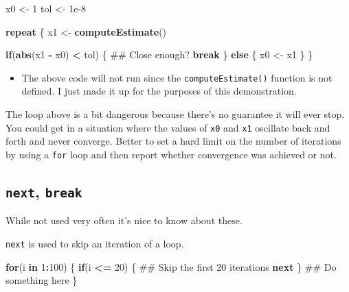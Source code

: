 \documentclass[]{book}
\newenvironment{Shaded}{\begin{snugshade}}{\end{snugshade}}
\newcommand{\ControlFlowTok}[1]{\textcolor[rgb]{0.13,0.29,0.53}{\textbf{#1}}}
\newcommand{\DecValTok}[1]{\textcolor[rgb]{0.00,0.00,0.81}{#1}}
\newcommand{\FloatTok}[1]{\textcolor[rgb]{0.00,0.00,0.81}{#1}}
\newcommand{\KeywordTok}[1]{\textcolor[rgb]{0.13,0.29,0.53}{\textbf{#1}}}
\newcommand{\NormalTok}[1]{#1}
\newcommand{\OperatorTok}[1]{\textcolor[rgb]{0.81,0.36,0.00}{\textbf{#1}}}
\newcommand{\StringTok}[1]{\textcolor[rgb]{0.31,0.60,0.02}{#1}}
\newenvironment{rmdblock}[1]
  {\begin{shaded*}
  \begin{itemize}
  \renewcommand{\labelitemi}{
    \raisebox{-.7\height}[0pt][0pt]{
      {\setkeys{Gin}{width=3em,keepaspectratio}\texttt{[image: images/\#1]}}
    }
  }
  \item
  }
  {
  \end{itemize}
  \end{shaded*}
  }
\newenvironment{rmdnote}
  {\begin{rmdblock}{note}}
  {\end{rmdblock}}
\theoremstyle{definition}
\theoremstyle{definition}
\theoremstyle{definition}
\theoremstyle{remark}
\begin{document}
\begin{Shaded}
\begin{Highlighting}[]
\NormalTok{x0 <-}\StringTok{ }\DecValTok{1}
\NormalTok{tol <-}\StringTok{ }\FloatTok{1e-8}

\ControlFlowTok{repeat}\NormalTok{ \{}
\NormalTok{        x1 <-}\StringTok{ }\KeywordTok{computeEstimate}\NormalTok{()}
        
        \ControlFlowTok{if}\NormalTok{(}\KeywordTok{abs}\NormalTok{(x1 }\OperatorTok{-}\StringTok{ }\NormalTok{x0) }\OperatorTok{<}\StringTok{ }\NormalTok{tol) \{  ## Close enough?}
                \ControlFlowTok{break}
\NormalTok{        \} }\ControlFlowTok{else}\NormalTok{ \{}
\NormalTok{                x0 <-}\StringTok{ }\NormalTok{x1}
\NormalTok{        \} }
\NormalTok{\}}
\end{Highlighting}
\end{Shaded}

\begin{rmdnote}
The above code will not run since the \texttt{computeEstimate()}
function is not defined. I just made it up for the purposes of this
demonstration.
\end{rmdnote}

The loop above is a bit dangerous because there's no guarantee it will
ever stop. You could get in a situation where the values of \texttt{x0}
and \texttt{x1} oscillate back and forth and never converge. Better to
set a hard limit on the number of iterations by using a \texttt{for}
loop and then report whether convergence was achieved or not.

\hypertarget{next-break}{%
\subsection{\texorpdfstring{\texttt{next},
\texttt{break}}{next, break}}\label{next-break}}

While not used very often it's nice to know about these.

\texttt{next} is used to skip an iteration of a loop.

\begin{Shaded}
\begin{Highlighting}[]
\ControlFlowTok{for}\NormalTok{(i }\ControlFlowTok{in} \DecValTok{1}\OperatorTok{:}\DecValTok{100}\NormalTok{) \{}
        \ControlFlowTok{if}\NormalTok{(i }\OperatorTok{<=}\StringTok{ }\DecValTok{20}\NormalTok{) \{}
\NormalTok{                ## Skip the first 20 iterations}
                \ControlFlowTok{next}                 
\NormalTok{        \}}
\NormalTok{        ## Do something here}
\NormalTok{\}}
\end{Highlighting}
\end{Shaded}
\end{document}

